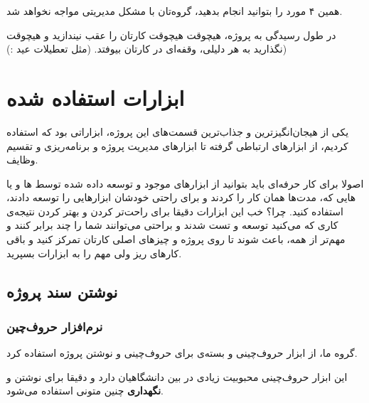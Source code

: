 همین ۴ مورد را بتوانید انجام بدهید، گروه‌تان با مشکل مدیریتی مواجه نخواهد شد.

در طول رسیدگی به پروژه، هیچوقت هیچوقت کارتان را عقب نیندازید و هیچوقت نگذارید به هر دلیلی، وقفه‌‌ای در کارتان بیوفتد. (مثل تعطیلات عید :))
\section{ابزارات استفاده شده}
یکی از هیجان‌انگیزترین و جذاب‌ترین قسمت‌های این پروژه، ابزاراتی بود که استفاده کردیم، از ابزار‌های ارتباطی گرفته تا ابزار‌های مدیریت پروژه و برنامه‌ریزی و تقسیم وظایف.

اصولا برای کار حرفه‌ای باید بتوانید از ابزار‌های موجود و توسعه‌ داده شده توسط ها و یا هایی که، مدت‌ها همان کار را کردند و برای راحتی خودشان ابزار‌هایی را توسعه دادند، استفاده کنید. چرا؟ خب این ابزارات دقیقا برای راحت‌تر کردن و بهتر کردن نتیجه‌ی کاری که می‌کنید توسعه و تست شدند و براحتی می‌توانند  شما را چند برابر کنند و مهم‌تر از همه، باعث شوند تا روی پروژه و چیز‌های اصلی کارتان تمرکز کنید و باقی کار‌های ریز ولی مهم را به ابزارات بسپرید.

\subsection{نوشتن سند پروژه}
\subsubsection{نرم‌افزار حروف‌چین}
گروه ما، از ابزار حروف‌چینی 
\lr{\LaTeX }
و بسته‌ی 
\lr{\XePersian }
 برای حروف‌چینی و نوشتن پروژه استفاده کرد.
  
  این ابزار حروف‌چینی محبوبیت زیادی در بین دانشگاهیان دارد و دقیقا برای نوشتن و \textbf{نگهداری} چنین متونی استفاده می‌شود.
  
